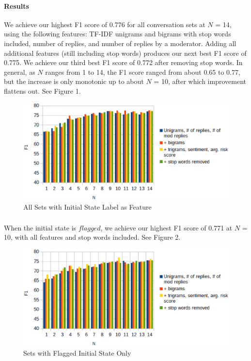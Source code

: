 \documentclass{article}
\begin{document}
\paragraph{Results}We achieve our highest F1 score of 0.776 for all conversation sets at $N$ = 14, using the following features: TF-IDF unigrams and bigrams with stop words included, number of replies, and number of replies by a moderator. Adding all additional features (still including stop words) produces our next best F1 score of 0.775. We achieve our third best F1 score of 0.772 after removing stop words. In general, as $N$ ranges from 1 to 14, the F1 score ranged from about 0.65 to 0.77, but the increase is only monotonic up to about $N$ = 10, after which improvement flattens out. See Figure 1.

\begin{figure}[h!]
    \includegraphics[width=14cm]{resultsAll}
    \caption{All Sets with Initial State Label as Feature}
\end{figure}

\subparagraph{}When the initial state is $flagged$, we achieve our highest F1 score of 0.771 at $N$ = 10, with all features and stop words included. See Figure 2.

\begin{figure}[h!]
    \includegraphics[width=14cm]{resultsFlagged}
    \caption{Sets with Flagged Initial State Only}
\end{figure}
\end{document}
